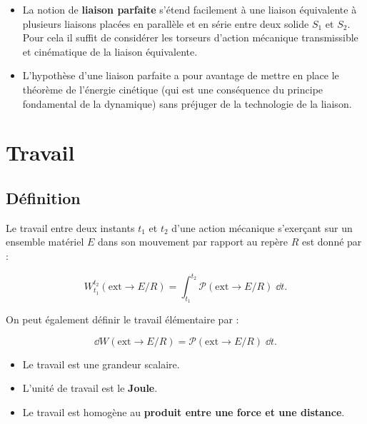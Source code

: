 \begin{remarque}%
\begin{itemize}
\item La notion de \textbf{liaison parfaite} s'étend facilement à une liaison équivalente à plusieurs liaisons placées en parallèle et en série entre deux solide $S_1$ et $S_2$. Pour cela il suffit de considérer les torseurs d'action mécanique transmissible et cinématique de la liaison équivalente.
\item L'hypothèse d'une liaison parfaite a pour avantage de mettre en place le théorème de l'énergie cinétique (qui est une conséquence du principe fondamental de la dynamique) sans préjuger de la technologie de la liaison.
\end{itemize}
\end{remarque}%


\section{Travail}
\subsection{Définition}
\begin{defi}[Travail]
Le travail entre deux instants $t_1$ et $t_2$ d'une action mécanique s'exerçant sur un ensemble matériel $E$ dans son mouvement par rapport au repère $R$ est donné par :

$$
\displaystyle{W^{t_2}_{t_1}}(\text{ext} \rightarrow E/R)=\displaystyle{\int_{t_1}^{t_2}}\mathcal{P}(\text{ext} \rightarrow E/R)\;\dd t.
$$
\end{defi}

\begin{remarque}%
On peut également définir le travail élémentaire par :

$$\dd W(\text{ext} \rightarrow E/R)=\mathcal{P}(\text{ext} \rightarrow E/R)\;\dd t.
$$

\begin{itemize}
\item Le travail est une grandeur scalaire.
\item L'unité de travail est le \textbf{Joule}.
\item Le travail est homogène au \textbf{produit entre une force et une distance}.
\end{itemize}

\end{remarque}%



